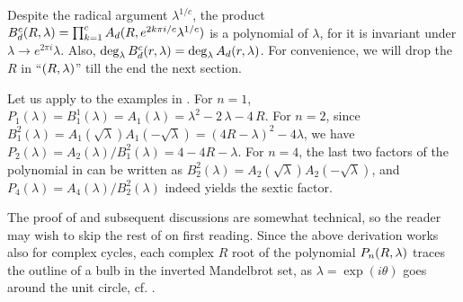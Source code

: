 \documentclass{ws-ijbc}
\begin{document}
Despite the radical argument $\lambda^{1/c}$,
  the product
  $B_d^c(R, \lambda) = \prod_{k=1}^c A_d(R, e^{2k\pi i/c} \lambda^{1/c})$
  is a polynomial of $\lambda$,
  for it is invariant under
  $\lambda \rightarrow e^{2\pi i} \lambda$.
Also, $\deg_\lambda B_d^c(r, \lambda) = \deg_\lambda A_d(r, \lambda)$.
For convenience, we will drop the $R$ in ``$(R, \lambda)$'' %
  till the end the next section.
%


%
Let us apply 
to the examples in .
For $n = 1$,
$P_1(\lambda) = B_1^1(\lambda) = A_1(\lambda)
  = \lambda^2 - 2\,\lambda - 4\,R$.
%
%
%
For $n = 2$, since
$B_1^2(\lambda)
=
A_1(\sqrt{\lambda})
A_1(-\sqrt{\lambda})
=
(4R-\lambda)^2 -4\lambda$,
%
we have $P_2(\lambda) = A_2(\lambda) / B_1^2(\lambda) = 4 - 4R - \lambda$.
%
%
For $n = 4$,
the last two factors of the polynomial in 
can be written as
$B_2^2(\lambda) = A_2(\sqrt{\lambda}) A_2(-\sqrt{\lambda})$,
and
%
$P_4(\lambda) = A_4(\lambda) / B_2^2(\lambda)$
indeed yields the sextic factor.






The proof of  and subsequent discussions
  are somewhat technical, so
  the reader may wish to skip the rest of 
  on first reading.
%
Since the above derivation works also for complex cycles,
  each complex $R$ root of the polynomial $P_n(R, \lambda)$ traces
  the outline of a bulb in the inverted Mandelbrot set,
  as $\lambda=\exp(i\theta)$ goes around the unit circle,
  cf. \cite{stephenson2, stephenson3}. %
%
\end{document}
